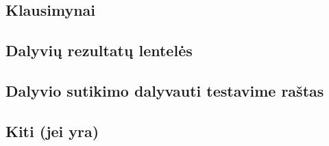 \documentclass{VUMIFPSkursinis}
\begin{document}
\subsection{Klausimynai}
\subsection{Dalyvių rezultatų lentelės}
\subsection{Dalyvio sutikimo dalyvauti testavime raštas}
\subsection{Kiti (jei yra)}


















\printbibliography[heading=bibintoc, title=Šaltiniai]  %
\end{document}

